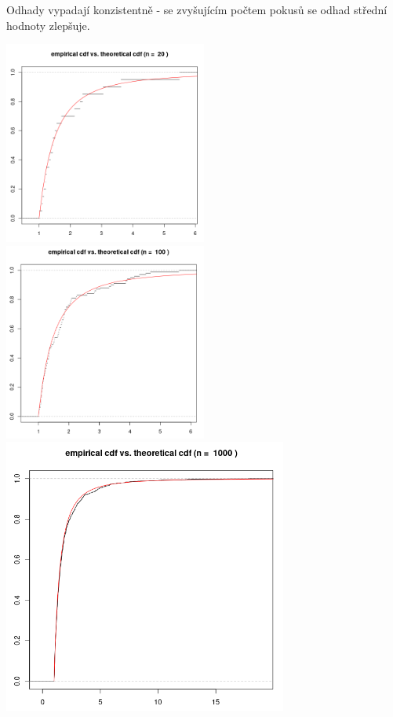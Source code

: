 \documentclass[a4paper]{article}
\begin{document}
Odhady vypadají konzistentně - se zvyšujícím počtem pokusů se odhad střední hodnoty zlepšuje.

\includegraphics[width=0.5\textwidth]{trial_20}
\includegraphics[width=0.5\textwidth]{trial_100}\\
\includegraphics[width=0.7\textwidth]{trial_1000}

\newpage
\end{document}
